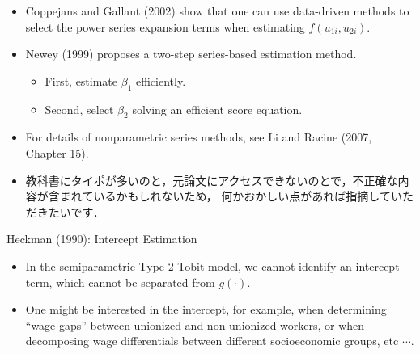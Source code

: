 \documentclass[xcolor=svgnames,dvipdfmx,cjk]{beamer}
\theoremstyle{example}
\begin{document}
\begin{frame}
      \begin{itemize}
            \item Coppejans and Gallant (2002) show that one can use data-driven methods 
                  to select the power series expansion terms when estimating $f(u_{1i}, u_{2i})$.
            \item Newey (1999) proposes a two-step series-based estimation method. 
                  \begin{itemize}
                        \item First, estimate $\beta_1$ efficiently.
                        \item Second, select $\beta_2$ solving an efficient score equation.
                  \end{itemize}
            \item For details of nonparametric series methods, see Li and Racine (2007, Chapter 15).
            \item 教科書にタイポが多いのと，元論文にアクセスできないのとで，不正確な内容が含まれているかもしれないため，
                  何かおかしい点があれば指摘していただきたいです．
      \end{itemize}
\end{frame}

\begin{frame}{Heckman (1990): Intercept Estimation}
      \begin{itemize}
            \item In the semiparametric Type-2 Tobit model, 
                  we cannot identify an intercept term, which cannot be separated from $g(\cdot)$.
            \item One might be interested in the intercept, for example, 
                  when determining ``wage gaps'' between unionized and non-unionized workers, or
                  when decomposing wage differentials between different socioeconomic groups, etc $\cdots$.
      \end{itemize}
\end{frame}
\end{document}
